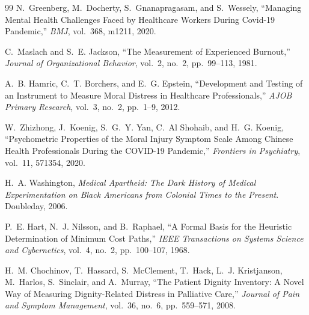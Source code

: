 \documentclass[12pt]{article}
\theoremstyle{definition}
\theoremstyle{remark}
\begin{document}
\begin{thebibliography}{99}
N.~Greenberg, M.~Docherty, S.~Gnanapragasam, and S.~Wessely, ``Managing Mental Health Challenges Faced by Healthcare Workers During Covid-19 Pandemic,'' \emph{BMJ}, vol.~368, m1211, 2020.

C.~Maslach and S.~E. Jackson, ``The Measurement of Experienced Burnout,'' \emph{Journal of Organizational Behavior}, vol.~2, no.~2, pp.~99--113, 1981.

A.~B. Hamric, C.~T. Borchers, and E.~G. Epstein, ``Development and Testing of an Instrument to Measure Moral Distress in Healthcare Professionals,'' \emph{AJOB Primary Research}, vol.~3, no.~2, pp.~1--9, 2012.

W.~Zhizhong, J.~Koenig, S.~G.~Y. Yan, C.~Al Shohaib, and H.~G. Koenig, ``Psychometric Properties of the Moral Injury Symptom Scale Among Chinese Health Professionals During the COVID-19 Pandemic,'' \emph{Frontiers in Psychiatry}, vol.~11, 571354, 2020.

H.~A. Washington, \emph{Medical Apartheid: The Dark History of Medical Experimentation on Black Americans from Colonial Times to the Present}.  Doubleday, 2006.

P.~E. Hart, N.~J. Nilsson, and B.~Raphael, ``A Formal Basis for the Heuristic Determination of Minimum Cost Paths,'' \emph{IEEE Transactions on Systems Science and Cybernetics}, vol.~4, no.~2, pp.~100--107, 1968.

H.~M. Chochinov, T.~Hassard, S.~McClement, T.~Hack, L.~J. Kristjanson, M.~Harlos, S.~Sinclair, and A.~Murray, ``The Patient Dignity Inventory: A Novel Way of Measuring Dignity-Related Distress in Palliative Care,'' \emph{Journal of Pain and Symptom Management}, vol.~36, no.~6, pp.~559--571, 2008.

\end{thebibliography}
\end{document}
